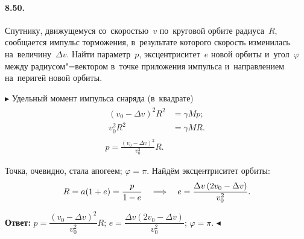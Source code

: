 \documentclass{weekly}
\begin{document}
\paragraph{8.50.} Спутнику, движущемуся со~скоростью~$v$ по~круговой
орбите радиуса~$R$, сообщается импульс торможения, в~результате
которого скорость изменилась на~величину~$\Delta v$.
Найти параметр~$p$, эксцентриситет~$e$ новой орбиты
и~угол~$\varphi$ между радиусом"=вектором в~точке приложения
импульса и~направлением на~перигей новой орбиты.

$\blacktriangleright$ Удельный момент импульса снаряда (в~квадрате)
\begin{gather}
\begin{split}
    \left(v_0 - \Delta v\right)^2 R^2 &= \gamma M p; \\
    v_0^2 R^2 &= \gamma M R.
\end{split}\\
    p = \frac{\left(v_0 - \Delta v\right)^2}{v_0^2} R.
\end{gather}

Точка, очевидно, стала апогеем; $\varphi = \pi$.
Найдём эксцентриситет орбиты:
\begin{equation}
    R = a(1+e) = \frac{p}{1-e}
\quad \Longrightarrow \quad
    e = \frac{\Delta v \left(2v_0 - \Delta v\right)}{v_0^2}.
\end{equation}

\textbf{Ответ:}\qquad
$p = \dfrac{\left(v_0 - \Delta v\right)^2}{v_0^2} R$;\quad
$e = \dfrac{\Delta v \left(2v_0 - \Delta v\right)}{v_0^2}$;\quad
$\varphi = \pi$.
\hfill $\blacktriangleleft$
\end{document}
